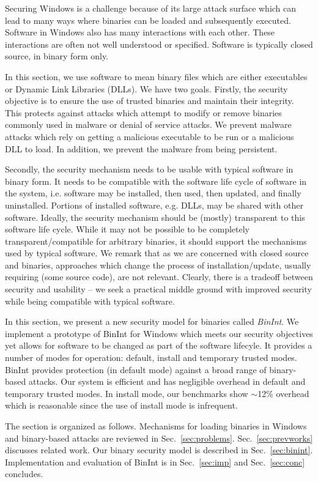 
Securing Windows is a challenge because of its large
attack surface which can lead to many ways where
binaries can be loaded and subsequently executed.
Software in Windows also has many interactions with each other.
These interactions are often not well understood or specified.
Software is typically closed source, in binary form only.

In this section, we use software to mean binary files which are either
executables or Dynamic Link Libraries (DLLs).
We have two goals. Firstly, the security objective 
is to ensure the use of trusted binaries and maintain their integrity.
This protects against attacks which attempt to modify or remove binaries 
commonly used in malware or denial of service attacks.
We prevent malware attacks which rely on
getting a malicious executable to be run or
a malicious DLL to load.
In addition, we prevent the malware from being persistent.

Secondly, the security mechanism needs to be usable with typical
software in binary form.
It needs to be compatible with the software life cycle of software in the
system, i.e.
software may be installed, then used, then updated, and 
finally uninstalled. 
Portions of installed software, e.g. DLLs,
may be shared with other software. 
Ideally, the security mechanism should be (mostly) transparent to 
this software life cycle.
While it may not be possible to be completely transparent/compatible 
for arbitrary binaries, it should support the mechanisms used 
by typical software.
We remark that as we are concerned with
closed source and binaries,
approaches which change the process of installation/update,
usually requiring (some source code), are not relevant.
Clearly, there is a tradeoff between security and usability --
we seek a practical middle ground with improved security while
being compatible with typical software.

In this section, we present a new security model
for binaries called {\em BinInt}.
We implement a prototype of BinInt for Windows 
which meets our security objectives yet allows
for software to be changed as part of the software lifecyle.
It provides a number of modes for operation: default, install 
and temporary trusted modes.
BinInt provides protection (in default mode) against a broad range of 
binary-based attacks.
Our system is efficient and has negligible overhead in default and temporary
trusted modes. 
In install mode, our benchmarks
show $\sim$12\% overhead which is reasonable since
the use of install mode is infrequent.

The section is organized as follows.
Mechanisms for loading binaries in
Windows and binary-based attacks are reviewed in Sec.~\ref{sec:problems}.
Sec.~\ref{sec:prevworks} discusses related work.
Our binary security model is described in Sec.~\ref{sec:binint}.
Implementation and evaluation of BinInt is in
Sec.~\ref{sec:imp} and Sec.~\ref{sec:conc} concludes.

